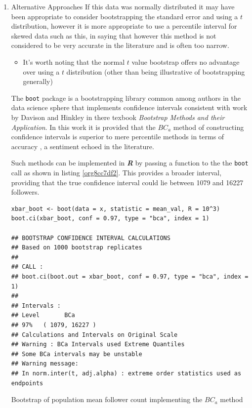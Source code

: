 \documentclass[11pt]{article}
\begin{document}
\begin{enumerate}
\item Alternative Approaches
\label{sec:org71efece}
If this data was normally distributed it may have been appropriate to consider
bootstrapping the standard error and using a \(t\) distribution, however it is more appropriate to use a
percentile interval for skewed data such as this, in saying that however this method is not considered to be very accurate in the literature and is often too narrow. \cite[Section 4.1]{hesterberg2015}

\begin{itemize}
\item It's worth noting that the normal \(t\) value bootstrap offers no advantage over
using a \(t\) distribution (other than being illustrative of bootstrapping
generally) \cite[Section 4.1]{hesterberg2015}
\end{itemize}


 The \texttt{boot} package is a bootstrapping library common among authors in the data science sphere
 \cite[p. 295]{james2013} \cite[p. 237]{wiley2019} that implements
 confidence intervals consistent with work by Davison and Hinkley
 \cite{ripley2020} in there texbook \emph{Bootstrap Methods and their Application}.
In this work it is provided that the \(BC_{a}\) method of constructing confidence
 intervals is  superior to mere percentile
 methods in terms of accuracy \cite[Ch. 5]{davison1997}, a sentiment echoed in the literature. \cite[Ch. 5]{carpenter2000,davison1997}

Such methods can be implemented in \textbf{\emph{R}} by passing a function to the the \texttt{boot} call as shown in listing \ref{org8cc7df2}. This provides a broader interval, providing that the true confidence interval could lie between 1079 and 16227 followers.

\begin{listing}[htbp]
\begin{verbatim}
xbar_boot <- boot(data = x, statistic = mean_val, R = 10^3)
boot.ci(xbar_boot, conf = 0.97, type = "bca", index = 1)

## BOOTSTRAP CONFIDENCE INTERVAL CALCULATIONS
## Based on 1000 bootstrap replicates
##
## CALL :
## boot.ci(boot.out = xbar_boot, conf = 0.97, type = "bca", index = 1)
##
## Intervals :
## Level       BCa
## 97%   ( 1079, 16227 )
## Calculations and Intervals on Original Scale
## Warning : BCa Intervals used Extreme Quantiles
## Some BCa intervals may be unstable
## Warning message:
## In norm.inter(t, adj.alpha) : extreme order statistics used as endpoints
\end{verbatim}
\caption{\label{org8cc7df2}Bootstrap of population mean follower count implementing the \(BC_{a}\) method}
\end{listing}
\end{enumerate}
\end{document}
